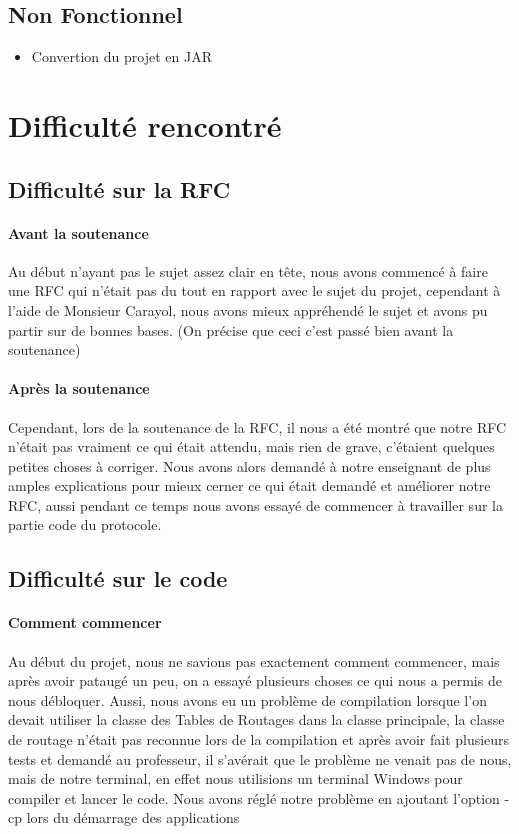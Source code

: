 \documentclass[a4paper,titlepage]{report}
\begin{document}
\subsection{Non Fonctionnel}
\begin{itemize}
\item Convertion du projet en JAR
\end{itemize}




\pagebreak
\section{Difficulté rencontré}
\subsection{Difficulté sur la RFC}
\paragraph{Avant la soutenance}
Au début n'ayant pas le sujet assez clair en tête, nous avons commencé à faire une RFC qui n'était pas du tout en rapport avec le sujet du projet, cependant à l'aide de Monsieur Carayol, nous avons mieux appréhendé le sujet et avons pu partir sur de bonnes bases. (On précise que ceci c'est passé bien avant la soutenance)
\paragraph{Après la soutenance}
Cependant, lors de la soutenance de la RFC, il nous a été montré que notre RFC n'était pas vraiment ce qui était attendu, mais rien de grave, c'étaient quelques petites choses à corriger.
Nous avons alors demandé à notre enseignant de plus amples explications pour mieux cerner ce qui était demandé et améliorer notre RFC, aussi pendant ce temps nous avons essayé de commencer à travailler sur la partie code du protocole.
\subsection{Difficulté sur le code}
\paragraph{Comment commencer}
Au début du projet, nous ne savions pas exactement comment commencer, mais après avoir pataugé un peu, on a essayé plusieurs choses ce qui nous a permis  de nous débloquer.
Aussi, nous avons eu un problème de compilation lorsque l'on devait utiliser la classe des Tables de Routages dans la classe principale, la classe de routage n'était pas reconnue lors de la compilation et après avoir fait plusieurs tests et demandé au professeur, il s'avérait que le problème ne venait pas de nous, mais de notre terminal, en effet nous utilisions un terminal Windows pour compiler et lancer le code.
Nous avons réglé notre problème en ajoutant l'option -cp lors du démarrage des applications
\end{document}
